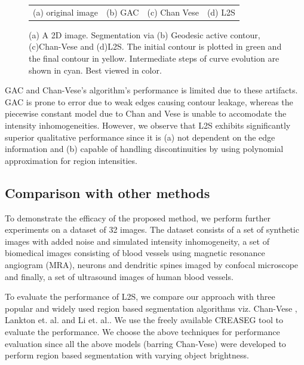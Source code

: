 \begin{figure}[t]
\begin{tabular}{@{}cccc@{}}
(a) original image & (b) GAC & (c) Chan Vese & (d) L2S
\end{tabular}
\caption[L2S vs GAC vs Chan-Vese]{(a) A 2D image. Segmentation via (b) Geodesic active contour, (c)Chan-Vese and (d)L2S. The initial contour is plotted in green and the final contour in yellow. Intermediate steps of curve evolution are shown in cyan. Best viewed in color.}
\label{fig:l2s_compare_GAC_CV}
\end{figure}
GAC and Chan-Vese's algorithm's performance is limited due to these artifacts. GAC is prone to error due to weak edges causing contour leakage, whereas the piecewise constant model due to Chan and Vese is unable to accomodate the intensity inhomogeneities. However, we observe that L2S exhibits significantly superior qualitative performance since it is (a) not dependent on the edge information and (b) capable of handling discontinuities by using polynomial approximation for region intensities.

\subsection{Comparison with other methods}
To demonstrate the efficacy of the proposed method, we perform further experiments on a dataset of 32 images. The dataset consists of a set of synthetic images with added noise and simulated intensity inhomogeneity, a set of biomedical images consisting of blood vessels using magnetic resonance angiogram (MRA), neurons and dendritic spines imaged by confocal microscope and finally, a set of ultrasound images of human blood vessels.  

To evaluate the performance of L2S, we compare our approach with three popular and widely used region based segmentation algorithms viz. Chan-Vese \cite{chan_vese}, Lankton et. al. \cite{lankton_localCV} and Li et. al.\cite{li_region_scalable}. We use the freely available CREASEG\cite{creaseg} tool to evaluate the performance. We choose the above techniques for performance evaluation since all the above models (barring Chan-Vese) were developed to perform region based segmentation with varying object brightness.

